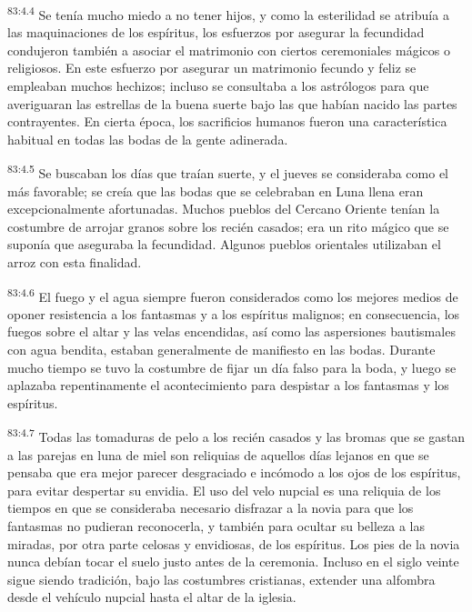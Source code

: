 \par
\textsuperscript{83:4.4} Se tenía mucho miedo a no tener hijos, y como la esterilidad se atribuía a las maquinaciones de los espíritus, los esfuerzos por asegurar la fecundidad condujeron también a asociar el matrimonio con ciertos ceremoniales mágicos o religiosos. En este esfuerzo por asegurar un matrimonio fecundo y feliz se empleaban muchos hechizos; incluso se consultaba a los astrólogos para que averiguaran las estrellas de la buena suerte bajo las que habían nacido las partes contrayentes. En cierta época, los sacrificios humanos fueron una característica habitual en todas las bodas de la gente adinerada.

\par
\textsuperscript{83:4.5} Se buscaban los días que traían suerte, y el jueves se consideraba como el más favorable; se creía que las bodas que se celebraban en Luna llena eran excepcionalmente afortunadas. Muchos pueblos del Cercano Oriente tenían la costumbre de arrojar granos sobre los recién casados; era un rito mágico que se suponía que aseguraba la fecundidad. Algunos pueblos orientales utilizaban el arroz con esta finalidad.

\par
\textsuperscript{83:4.6} El fuego y el agua siempre fueron considerados como los mejores medios de oponer resistencia a los fantasmas y a los espíritus malignos; en consecuencia, los fuegos sobre el altar y las velas encendidas, así como las aspersiones bautismales con agua bendita, estaban generalmente de manifiesto en las bodas. Durante mucho tiempo se tuvo la costumbre de fijar un día falso para la boda, y luego se aplazaba repentinamente el acontecimiento para despistar a los fantasmas y los espíritus.

\par
\textsuperscript{83:4.7} Todas las tomaduras de pelo a los recién casados y las bromas que se gastan a las parejas en luna de miel son reliquias de aquellos días lejanos en que se pensaba que era mejor parecer desgraciado e incómodo a los ojos de los espíritus, para evitar despertar su envidia. El uso del velo nupcial es una reliquia de los tiempos en que se consideraba necesario disfrazar a la novia para que los fantasmas no pudieran reconocerla, y también para ocultar su belleza a las miradas, por otra parte celosas y envidiosas, de los espíritus. Los pies de la novia nunca debían tocar el suelo justo antes de la ceremonia. Incluso en el siglo veinte sigue siendo tradición, bajo las costumbres cristianas, extender una alfombra desde el vehículo nupcial hasta el altar de la iglesia.

